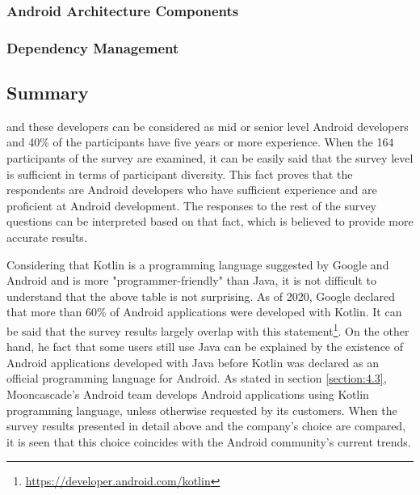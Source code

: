 \subsubsection{Android Architecture Components}
\label{section:4.5.4}
\subsubsection{Dependency Management}
\label{section:4.5.5}

\subsection{Summary}

and these developers can be considered as mid or senior level Android developers and 40\% of the participants have five years or more experience.
When the 164 participants of the survey are examined, it can be easily said that the survey level is sufficient in terms of participant diversity. This fact proves that the respondents are Android developers who have sufficient experience and are proficient at Android development. The responses to the rest of the survey questions can be interpreted based on that fact, which is believed to provide more accurate results.

Considering that Kotlin is a programming language suggested by Google and Android and is more "programmer-friendly" than Java, it is not difficult to understand that the above table is not surprising. As of 2020, Google declared that more than 60\% of Android applications were developed with Kotlin. It can be said that the survey results largely overlap with this statement\footnote{\url{https://developer.android.com/kotlin}}. On the other hand, he fact that some users still use Java can be explained by the existence of Android applications developed with Java before Kotlin was declared as an official programming language for Android. As stated in section \ref{section:4.3}, Mooncascade's Android team develops Android applications using Kotlin programming language, unless otherwise requested by its customers. When the survey results presented in detail above and the company's choice are compared, it is seen that this choice coincides with the Android community’s current trends.

